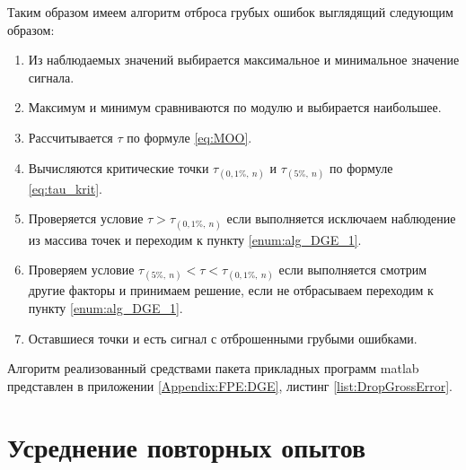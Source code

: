 Таким образом имеем алгоритм отброса грубых ошибок выглядящий следующим образом:
\begin{enumerate}
	\item Из наблюдаемых значений выбирается максимальное и минимальное значение сигнала.\label{enum:alg_DGE_1}
	\item Максимум и минимум сравниваются по модулю и выбирается наибольшее.
	\item Рассчитывается $ \tau $ по формуле \ref{eq:MOO}.
	\item Вычисляются критические точки $ \tau_{(0,1\%,\ n)} $ и $ \tau_{(5\%,\ n)} $ по формуле \ref{eq:tau_krit}.
	\item Проверяется условие $ \tau > \tau_{(0,1\%,\ n)} $ если выполняется исключаем наблюдение из массива точек и переходим к пункту \ref{enum:alg_DGE_1}.
	\item Проверяем условие $ \tau_{(5\%,\ n)} < \tau < \tau_{(0,1\%,\ n)} $ если выполняется смотрим другие факторы и принимаем решение, если не отбрасываем переходим к пункту \ref{enum:alg_DGE_1}.
	\item Оставшиеся точки и есть сигнал с отброшенными грубыми ошибками.
\end{enumerate}

Алгоритм реализованный средствами пакета прикладных программ matlab представлен в приложении \ref{Appendix:FPE:DGE}, листинг \ref{list:DropGrossError}.





%		




\section{Усреднение повторных опытов}\label{sect3_3}


